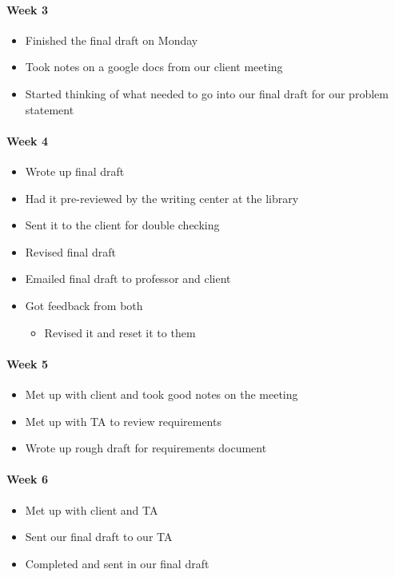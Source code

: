 \documentclass[onecolumn, draftclsnofoot,10pt, compsoc]{IEEEtran}
\begin{document}
      \paragraph{Week 3}
        \begin{itemize}
          \item Finished the final draft on Monday
          \item Took notes on a google docs from our client meeting
          \item Started thinking of what needed to go into our final draft for our problem statement
        \end{itemize}

      \paragraph{Week 4}
        \begin{itemize}
          \item Wrote up final draft
          \item Had it pre-reviewed by the writing center at the library
          \item Sent it to the client for double checking
          \item Revised final draft
          \item Emailed final draft to professor and client
          \item Got feedback from both
            \begin{itemize}
              \item Revised it and reset it to them
            \end{itemize}
        \end{itemize}

      \paragraph{Week 5}
        \begin{itemize}
          \item Met up with client and took good notes on the meeting
          \item Met up with TA to review requirements
          \item Wrote up rough draft for requirements document
        \end{itemize}

      \paragraph{Week 6}
        \begin{itemize}
          \item Met up with client and TA
          \item Sent our final draft to our TA
          \item Completed and sent in our final draft
        \end{itemize}
\end{document}
